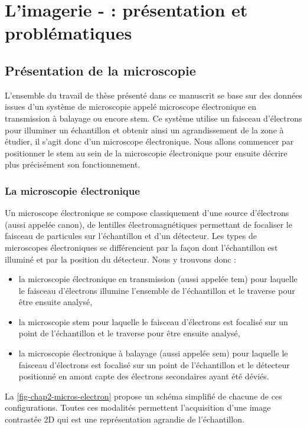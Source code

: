 
\chapter{L'imagerie - : présentation et problématiques}
\label{ch-chapter_1}

    \dochaptoc
    \graphicspath{{img/chapitre1/}}

    \section{Présentation de la microscopie }

    L'ensemble du travail de thèse présenté dans ce manuscrit se base sur des données issues d'un système de microscopie appelé microscope électronique en transmission à balayage ou encore \acf{stem}. Ce système utilise un faisceau d'électrons pour illuminer un échantillon et obtenir ainsi un agrandissement de la zone à étudier, il s'agit donc d'un microscope électronique. Nous allons commencer par positionner le \gls{stem} au sein de la microscopie électronique pour ensuite décrire plus précisément son fonctionnement.

    \subsection{La microscopie électronique}

    Un microscope électronique se compose classiquement d'une source d'électrons (aussi appelée canon), de lentilles électromagnétiques permettant de focaliser le faisceau de particules sur l'échantillon et d'un détecteur. Les types de microscopes électroniques se différencient par la façon dont l'échantillon est illuminé et par la position du détecteur. Nous y trouvons donc :
    \begin{itemize}
    	\item la microscopie électronique en transmission (aussi appelée \gls{tem}) pour laquelle le faisceau d'électrons illumine l'ensemble de l'échantillon et le traverse pour être ensuite analysé,
    	\item la microscopie \gls{stem} pour laquelle le faisceau d'électrons est focalisé sur un point de l'échantillon et le traverse pour être ensuite analysé,
    	\item la microscopie électronique à balayage (aussi appelée \gls{sem}) pour laquelle le faisceau d'électrons est focalisé sur un point de l'échantillon et le détecteur positionné en amont capte des électrons secondaires ayant été déviés.
    \end{itemize}
    La \cref{fig-chap2-micros-electron} propose un schéma simplifié de chacune de ces configurations. Toutes ces modalités permettent l'acquisition d'une image contrastée 2D qui est une représentation agrandie de l'échantillon.

